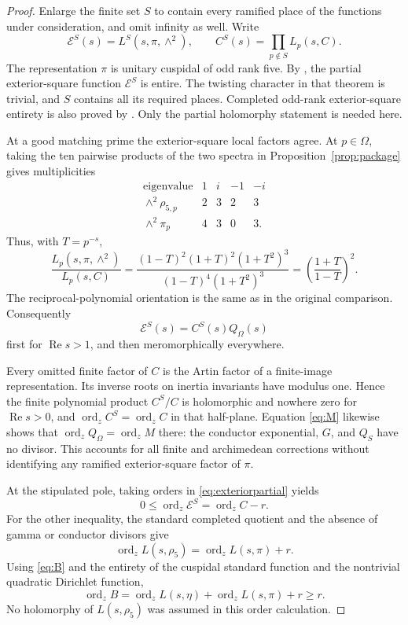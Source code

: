 \documentclass[11pt]{article}
\theoremstyle{definition}
\theoremstyle{remark}
\newcommand{\ord}{\operatorname{ord}}
\newcommand{\rh}{\rho_5}
\newcommand{\Rea}{\operatorname{Re}}
\numberwithin{equation}{section}
\begin{document}
\begin{proof}
Enlarge the finite set $S$ to contain every ramified place of the functions under consideration, and omit infinity as well. Write
\[
\mathcal E^S(s)=L^S(s,\pi,\wedge^2),\qquad
C^S(s)=\prod_{p\notin S}L_p(s,C).
\]
The representation $\pi$ is unitary cuspidal of odd rank five. By \citet[Theorem 6.2]{belt}, the partial exterior-square function $\mathcal E^S$ is entire. The twisting character in that theorem is trivial, and $S$ contains all its required places. Completed odd-rank exterior-square entirety is also proved by \citet[Theorem 3.5]{kim1999}. Only the partial holomorphy statement is needed here.

At a good matching prime the exterior-square local factors agree. At $p\in\Omega$, taking the ten pairwise products of the two spectra in Proposition~\ref{prop:package} gives multiplicities
\[
\begin{array}{c|rrrr}
\text{eigenvalue}&1&i&-1&-i\\\hline
\wedge^2\rho_{5,p}&2&3&2&3\\
\wedge^2\pi_p&4&3&0&3.
\end{array}
\]
Thus, with $T=p^{-s}$,
\[
\frac{L_p(s,\pi,\wedge^2)}{L_p(s,C)}
=\frac{(1-T)^2(1+T)^2(1+T^2)^3}
{(1-T)^4(1+T^2)^3}
=\left(\frac{1+T}{1-T}\right)^2.
\]
The reciprocal-polynomial orientation is the same as in the original comparison. Consequently
\begin{equation}\label{eq:exteriorpartial}
\mathcal E^S(s)=C^S(s)Q_\Omega(s)
\end{equation}
first for $\Rea s>1$, and then meromorphically everywhere.

Every omitted finite factor of $C$ is the Artin factor of a finite-image representation. Its inverse roots on inertia invariants have modulus one. Hence the finite polynomial product $C^S/C$ is holomorphic and nowhere zero for $\Rea s>0$, and $\ord_zC^S=\ord_zC$ in that half-plane. Equation \eqref{eq:M} likewise shows that $\ord_zQ_\Omega=\ord_zM$ there: the conductor exponential, $G$, and $Q_S$ have no divisor. This accounts for all finite and archimedean corrections without identifying any ramified exterior-square factor of $\pi$.

At the stipulated pole, taking orders in \eqref{eq:exteriorpartial} yields
\[
0\le\ord_z\mathcal E^S=\ord_zC-r.
\]
For the other inequality, the standard completed quotient and the absence of gamma or conductor divisors give
\[
\ord_zL(s,\rh)=\ord_zL(s,\pi)+r.
\]
Using \eqref{eq:B} and the entirety of the cuspidal standard function and the nontrivial quadratic Dirichlet function,
\[
\ord_zB=\ord_zL(s,\eta)+\ord_zL(s,\pi)+r\ge r.
\]
No holomorphy of $L(s,\rh)$ was assumed in this order calculation.
\end{proof}
\end{document}
